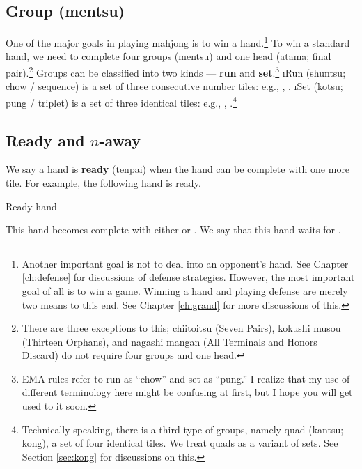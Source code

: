 \vfill
\subsection{Group ({\jap mentsu})}
 

One of the major goals in playing mahjong is to win a hand.\footnote{Another important goal is not to deal into an opponent's hand. See Chapter \ref{ch:defense} for discussions of defense strategies. However, the most important goal of all is to win a game. Winning a hand and playing defense are merely two means to this end. See Chapter \ref{ch:grand} for more discussions of this.}
To win a standard hand, we need to complete four groups ({\jap mentsu}) and one head ({\jap atama}; final pair).\footnote{There are three exceptions to this; {\jap chiitoitsu} (Seven Pairs), {\jap kokushi musou} (Thirteen Orphans), and {\jap nagashi mangan} (All Terminals and Honors Discard) do not require four groups and one head.} 
Groups can be classified into two kinds --- {\bf run} and {\bf set}.\footnote{EMA rules refer to run as ``chow'' and set as ``pung.'' I realize that my use of different terminology here might be confusing at first, but I hope you will get used to it soon.}
\bi
\i Run ({\jap shuntsu}; chow / sequence) is a set of three consecutive number tiles: e.g., {\LARGE {}}, {\LARGE {}}. 
\i Set ({\jap kotsu}; pung / triplet) is a set of three identical tiles: e.g., {\LARGE {}}, {\LARGE \fa\fa\fa}.\footnote{Technically speaking, there is a third type of groups, namely quad ({\jap kantsu}; kong), a set of four identical tiles. We treat quads as a variant of sets. See Section \ref{sec:kong} for discussions on this.} 
\ei
 

\subsection{Ready and $n$-away}
	 
We say a hand is {\bf ready} ({\jap tenpai}) when the hand can be complete with one more tile. For example, the following hand is ready. 
\bigskip
\begin{itembox}[r]{Ready hand}
\bp
{}\zhong\zhong\zhong
\ep
\end{itembox}
This hand becomes complete with either {\LARGE{}} or {\LARGE{}}. We say that this hand waits for {\LARGE{} }.

